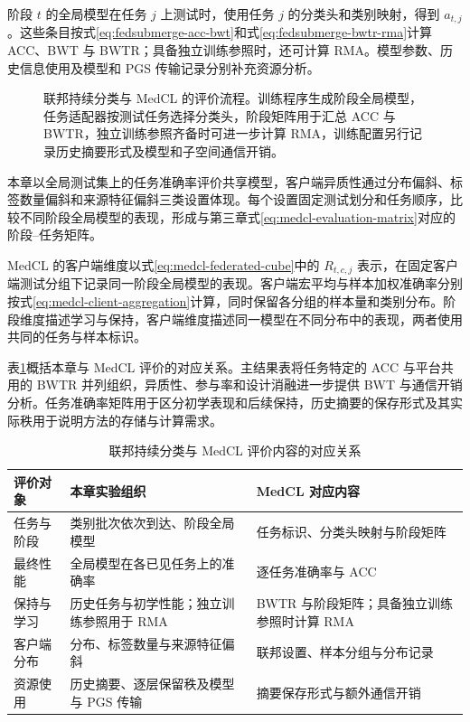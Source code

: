 阶段 $t$ 的全局模型在任务 $j$ 上测试时，使用任务 $j$ 的分类头和类别映射，得到 $a_{t,j}$。这些条目按式\eqref{eq:fedsubmerge-acc-bwt}和式\eqref{eq:fedsubmerge-bwtr-rma}计算 ACC、BWT 与 BWTR；具备独立训练参照时，还可计算 RMA。模型参数、历史信息使用及模型和 PGS 传输记录分别补充资源分析。

\begin{figure}[htbp]
\centering
\resizebox{\thesisfigurewidth}{!}{}
\caption[联邦持续分类与 MedCL 的评价流程]{联邦持续分类与 MedCL 的评价流程。训练程序生成阶段全局模型，任务适配器按测试任务选择分类头，阶段矩阵用于汇总 ACC 与 BWTR，独立训练参照齐备时可进一步计算 RMA，训练配置另行记录历史摘要形式及模型和子空间通信开销。}
\label{fig:fedsubmerge-engineering}
\end{figure}

本章以全局测试集上的任务准确率评价共享模型，客户端异质性通过分布偏斜、标签数量偏斜和来源特征偏斜三类设置体现。每个设置固定测试划分和任务顺序，比较不同阶段全局模型的表现，形成与第三章式\eqref{eq:medcl-evaluation-matrix}对应的阶段--任务矩阵。

MedCL 的客户端维度以式\eqref{eq:medcl-federated-cube}中的 $R_{t,c,j}$ 表示，在固定客户端测试分组下记录同一阶段全局模型的表现。客户端宏平均与样本加权准确率分别按式\eqref{eq:medcl-client-aggregation}计算，同时保留各分组的样本量和类别分布。阶段维度描述学习与保持，客户端维度描述同一模型在不同分布中的表现，两者使用共同的任务与样本标识。

表\ref{tab:fedsubmerge-system-boundary}概括本章与 MedCL 评价的对应关系。主结果表将任务特定的 ACC 与平台共用的 BWTR 并列组织，异质性、参与率和设计消融进一步提供 BWT 与通信开销分析。任务准确率矩阵用于区分初学表现和后续保持，历史摘要的保存形式及其实际秩用于说明方法的存储与计算需求。

\begin{table}[htbp]
\centering
\caption{联邦持续分类与 MedCL 评价内容的对应关系}
\label{tab:fedsubmerge-system-boundary}
\thesistablefont
\setlength{\tabcolsep}{3pt}
\renewcommand{\arraystretch}{1.16}
\begin{tabularx}{\textwidth}{@{}p{2.4cm}XX@{}}
\toprule
评价对象 & 本章实验组织 & MedCL 对应内容 \\
\midrule
任务与阶段 & 类别批次依次到达、阶段全局模型 & 任务标识、分类头映射与阶段矩阵 \\
最终性能 & 全局模型在各已见任务上的准确率 & 逐任务准确率与 ACC \\
保持与学习 & 历史任务与初学性能；独立训练参照用于 RMA & BWTR 与阶段矩阵；具备独立训练参照时计算 RMA \\
客户端分布 & 分布、标签数量与来源特征偏斜 & 联邦设置、样本分组与分布记录 \\
资源使用 & 历史摘要、逐层保留秩及模型与 PGS 传输 & 摘要保存形式与额外通信开销 \\
\bottomrule
\end{tabularx}
\end{table}

